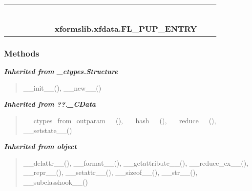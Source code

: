    \label{xformslib:xfdata:FL_PUP_ENTRY}
\begin{tabular}{cccccccccc}
\multicolumn{2}{r}{\settowidth{\BCL}{object}\multirow{2}{\BCL}{object}}
&&
&&
&&
  \\\cline{3-3}
  &&\multicolumn{1}{c|}{}
&&
&&
&&
  \\
\multicolumn{4}{r}{\settowidth{\BCL}{??.\_CData}\multirow{2}{\BCL}{??.\_CData}}
&&
&&
  \\\cline{5-5}
  &&&&\multicolumn{1}{c|}{}
&&
&&
  \\
\multicolumn{6}{r}{\settowidth{\BCL}{\_ctypes.Structure}\multirow{2}{\BCL}{\_ctypes.Structure}}
&&
  \\\cline{7-7}
  &&&&&&\multicolumn{1}{c|}{}
&&
  \\
&&&&&&\multicolumn{2}{l}{\textbf{xformslib.xfdata.FL\_PUP\_ENTRY}}
\end{tabular}



  \subsubsection{Methods}


\large{\textbf{\textit{Inherited from \_ctypes.Structure}}}

\begin{quote}
\_\_init\_\_(), \_\_new\_\_()
\end{quote}

\large{\textbf{\textit{Inherited from ??.\_CData}}}

\begin{quote}
\_\_ctypes\_from\_outparam\_\_(), \_\_hash\_\_(), \_\_reduce\_\_(), \_\_setstate\_\_()
\end{quote}

\large{\textbf{\textit{Inherited from object}}}

\begin{quote}
\_\_delattr\_\_(), \_\_format\_\_(), \_\_getattribute\_\_(), \_\_reduce\_ex\_\_(), \_\_repr\_\_(), \_\_setattr\_\_(), \_\_sizeof\_\_(), \_\_str\_\_(), \_\_subclasshook\_\_()
\end{quote}

